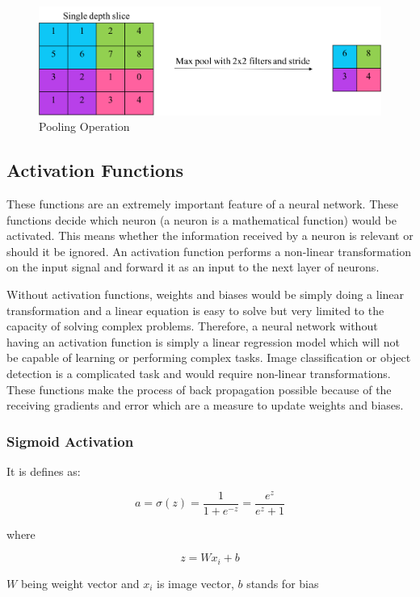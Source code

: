 \documentclass[11pt]{article}
\begin{document}
\begin{figure}[H]
	\centering
	\includegraphics[width=.6\linewidth]{files/cnn_architecture/pooling.png}
	\caption{Pooling Operation}
	\label{fig:Pooling Operation}
\end{figure}

\subsection{Activation Functions}
These functions are an extremely important feature of a neural network. These functions decide which neuron (a neuron is a mathematical function) would be activated. This means whether the information received by a neuron is relevant or should it be ignored. An activation function performs a non-linear transformation on the input signal and forward it as an input to the next layer of neurons.

Without activation functions, weights and biases would be simply doing a linear transformation and a linear equation is easy to solve but very limited to the capacity of solving complex problems. Therefore, a neural network without having an activation function is simply a linear regression model which will not be capable of learning or performing complex tasks. Image classification or object detection is a complicated task and would require non-linear transformations. These functions make the process of back propagation possible because of the receiving gradients and error which are a measure to update weights and biases.

\subsubsection{Sigmoid Activation}
It is defines as:

\begin{equation}
a = \sigma(z) = \frac{1}{1+e^{-z}}=\frac{e^{z}}{e^{z}+1}
\end{equation}

where

\begin{equation}
z = Wx_i + b
\end{equation}

$W$ being weight vector and $x_i$ is image vector, $b$ stands for bias
\end{document}
